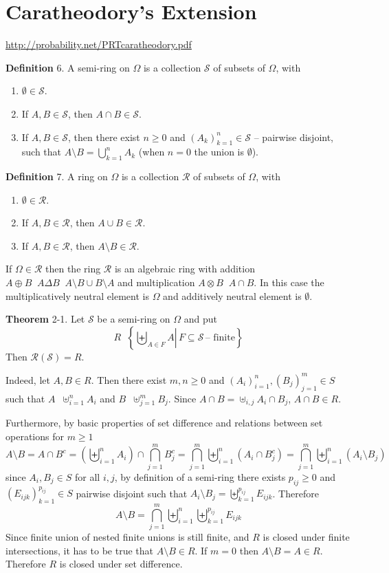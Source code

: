 \documentclass[a4paper]{article}
\newcommand{\obj}[1]{\left\{ #1 \right \}}
\newcommand{\brac}[1]{\left ( #1 \right )}
\newcommand{\induc}[1]{\left . #1 \right \vert}
\newcommand{\Scal}{\mathcal{S}}
\newcommand{\Ring}[1]{\mathcal{R}\brac{#1}}
\newcommand{\defn}{\mathop{\overset{\Delta}{=}}\nolimits}
\begin{document}
\section{Caratheodory's Extension} %
\label{sec:tut_2}
\url{http://probability.net/PRTcaratheodory.pdf}

\noindent \textbf{Definition} 6.
A semi-ring on $\Omega$ is a collection $\Scal$ of subsets of $\Omega$, with\begin{enumerate}
	\item $\emptyset\in \Scal$.
	\item If $A,B\in \Scal$, then $A\cap B\in \Scal$.
	\item If $A,B\in \Scal$, then there exist $n\geq 0$ and $\brac{A_k}_{k=1}^n\in \Scal$ -- pairwise disjoint, such that $A\setminus B = \bigcup_{k=1}^n A_k$ (when $n=0$ the union is $\emptyset$). 
\end{enumerate}

\noindent \textbf{Definition} 7.
A ring on $\Omega$ is a collection $\mathcal{R}$ of subsets of $\Omega$, with \begin{enumerate}
	\item $\emptyset\in \mathcal{R}$.
	\item If $A,B\in \mathcal{R}$, then $A\cup B\in \mathcal{R}$.
	\item If $A,B\in \mathcal{R}$, then $A\setminus B\in \mathcal{R}$.
\end{enumerate}

If $\Omega\in \mathcal{R}$ then the ring $\mathcal{R}$ is an algebraic ring with addition $A\oplus B \defn A\Delta B \defn A\setminus B \cup B\setminus A$ and multiplication $A\otimes B \defn A\cap B$. In this case the multiplicatively neutral element is $\Omega$ and additively neutral element is $\emptyset$.

\label{thm:ring_semi_ring_pairwise} \noindent \textbf{Theorem} 2-1.
Let $\Scal$ be a semi-ring on $\Omega$ and put \[R\defn \obj{ \induc{\biguplus_{A\in F} A}\, F\subseteq \Scal\,\text{-- finite} }\] Then $\Ring{\Scal} = R$.

Indeed, let $A,B\in R$. Then there exist $m,n\geq 0$ and $\brac{A_i}_{i=1}^n, \brac{B_j}_{j=1}^m\in S$ such that $A\defn \uplus_{i=1}^n A_i$ and $B\defn \uplus_{j=1}^m B_j$. Since $A\cap B = \uplus_{i,j} A_i\cap B_j$, $A\cap B\in R$.

Furthermore, by basic properties of set difference and relations between set operations for $m\geq1$ \[A\setminus B = A\cap B^c = \brac{\biguplus_{i=1}^n A_i} \cap \bigcap_{j=1}^m B_j^c = \bigcap_{j=1}^m \biguplus_{i=1}^n \brac{A_i \cap B_j^c} = \bigcap_{j=1}^m \biguplus_{i=1}^n \brac{A_i \setminus B_j}\]  since $A_i,B_j\in S$ for all $i,j$, by definition of a semi-ring there exists $p_{ij}\geq 0$ and $\brac{E_{ijk}}_{k=1}^{p_{ij}}\in S$ pairwise disjoint such that $A_i\setminus B_j = \biguplus_{k=1}^{p_{ij}} E_{ijk}$. Therefore \[A\setminus B = \bigcap_{j=1}^m \biguplus_{i=1}^n \biguplus_{k=1}^{p_{ij}} E_{ijk}\] Since finite union of nested finite unions is still finite, and $R$ is closed under finite intersections, it has to be true that $A\setminus B\in R$. If $m=0$ then $A\setminus B = A\in R$. Therefore $R$ is closed under set difference.
\end{document}
